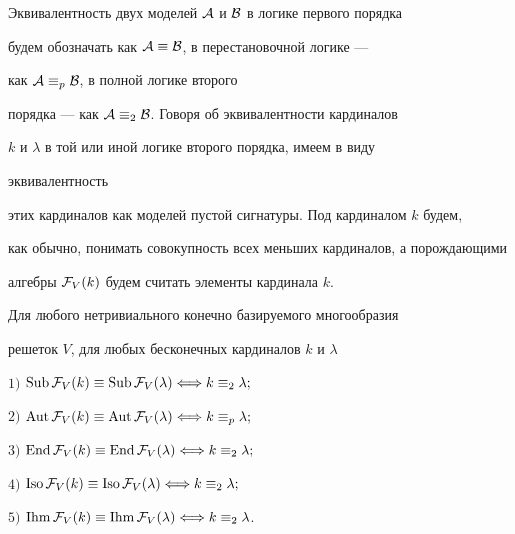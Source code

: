 \medskip





Эквивалентность двух моделей $\cal A$ и $\cal B$ в логике первого порядка


будем обозначать как ${\cal A}\equiv\cal B$, в перестановочной логике ---


как ${\cal A}\equiv_p\cal B$, в полной логике второго


порядка --- как ${\cal A}\equiv_2\cal B$. Говоря об эквивалентности кардиналов 


$k$ и $\lambda$ в той или иной логике второго порядка, имеем в виду 


эквивалентность


этих кардиналов как моделей пустой сигнатуры. Под кардиналом $k$ будем, 


как обычно, понимать совокупность всех меньших кардиналов, а порождающими


алгебры ${\cal F}_V(k)$ будем считать элементы кардинала $k$.








\begin{thm}


Для любого нетривиального конечно базируемого многообразия


решеток $V$, для любых бесконечных кардиналов $k$ и $\lambda$





$1)$ $\Sub{\cal F}_V(k)\equiv \Sub{\cal F}_V(\lambda)\Longleftrightarrow k


\equiv_2\lambda;$





$2)$ $\Aut{\cal F}_V(k)\equiv \Aut{\cal F}_V(\lambda)\Longleftrightarrow k


\equiv_p\lambda;$





$3)$ $\End{\cal F}_V(k)\equiv \End{\cal F}_V(\lambda)\Longleftrightarrow k


\equiv_2\lambda;$





$4)$ $\Iso{\cal F}_V(k)\equiv \Iso{\cal F}_V(\lambda)\Longleftrightarrow k


\equiv_2\lambda;$





$5)$ $\Ihm{\cal F}_V(k)\equiv \Ihm{\cal F}_V(\lambda)\Longleftrightarrow k


\equiv_2\lambda$.


\end{thm}





